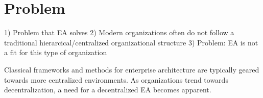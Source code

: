 \chapter{Problem}
1) Problem that EA solves
2) Modern organizations often do not follow a traditional hierarcical/centralized organizational structure
3) Problem: EA is not a fit for this type of organization

Classical frameworks and methods for enterprise architecture are typically geared towards more centralized environments. As organizations trend towards decentralization, a need for a decentralized EA becomes apparent.
